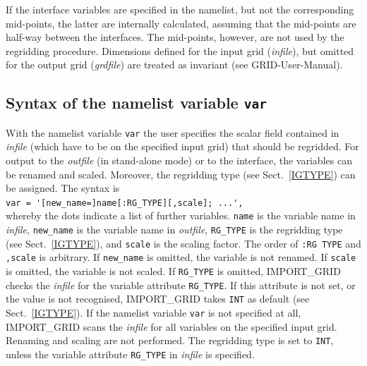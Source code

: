 \documentclass[11pt,twoside]{report}
\begin{document}
If the interface variables are specified in the namelist, but not the corresponding
mid-points, the latter are internally calculated, assuming that the mid-points are
half-way between the interfaces. The mid-points, however, are not used by the
regridding procedure.
Dimensions defined for the input grid ({\it infile}), but omitted for the output grid
({\it grdfile}) are treated as invariant (see GRID-User-Manual).

\subsection{Syntax of the namelist variable {\tt var}}

With the namelist variable \verb|var| the user specifies the scalar field
contained in {\it infile} (which
have to be on the specified input grid) that should be regridded. For output to
 the {\it outfile} (in stand-alone mode) or to the interface, the
 variables can be  renamed and scaled. Moreover, the regridding type (see
Sect.~\ref{IGTYPE}) can be assigned. The syntax is\\
\verb|var = '[new_name=]name[:RG_TYPE][,scale]; ...',|\\
whereby the dots indicate a list of further variables. \verb|name| is
the variable name in 
{\it infile}, \verb|new_name| is the variable name in {\it outfile}, \verb|RG_TYPE|
 is the regridding type (see Sect.~\ref{IGTYPE}), and  \verb|scale| is the scaling factor. 
The order of  \verb|:RG TYPE| and  \verb|,scale| is arbitrary.
If  \verb|new_name| is omitted, the variable is not renamed. If  \verb|scale| is omitted, the
variable is not scaled. If  \verb|RG_TYPE| is omitted, IMPORT\_GRID checks the  {\it infile}
 for the variable attribute  \verb|RG_TYPE|.
 If this attribute is not set, or the value is not recognised,
 IMPORT\_GRID takes \verb|INT| as default (see Sect.~\ref{IGTYPE}).
If the namelist variable \verb|var| is not specified at all, IMPORT\_GRID scans the {\it infile}
 for all variables on the specified input grid. Renaming and scaling are not performed.
The regridding type is set to \verb|INT|, unless the variable attribute \verb|RG_TYPE| in 
{\it infile} is specified.

\end{document}
